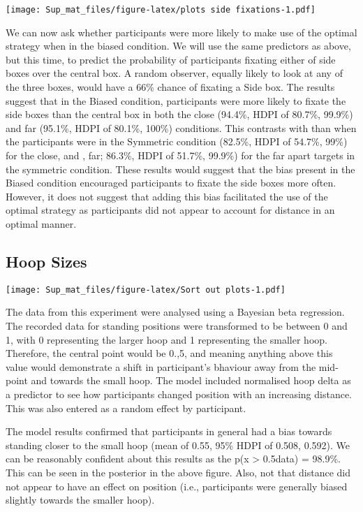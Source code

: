 \documentclass[
]{article}
\begin{document}
\texttt{[image: Sup\_mat\_files/figure-latex/plots side fixations-1.pdf]}

We can now ask whether participants were more likely to make use of the optimal strategy when in the biased condition. We will use the same predictors as above, but this time, to predict the probability of participants fixating either of side boxes over the central box. A random observer, equally likely to look at any of the three boxes, would have a 66\% chance of fixating a Side box. The results suggest that in the Biased condition, participants were more likely to fixate the side boxes than the central box in both the close (94.4\%, HDPI of \textbar{}80.7\%, 99.9\%\textbar{}) and far (95.1\%, HDPI of \textbar{}80.1\%, 100\%\textbar{}) conditions. This contrasts with than when the participants were in the Symmetric condition (82.5\%, HDPI of \textbar{}54.7\%, 99\%\textbar{}) for the close, and , far; 86.3\%, HDPI of \textbar{}51.7\%, 99.9\%\textbar{}) for the far apart targets in the symmetric condition. These results would suggest that the bias present in the Biased condition encouraged participants to fixate the side boxes more often. However, it does not suggest that adding this bias facilitated the use of the optimal strategy as participants did not appear to account for distance in an optimal manner.

\hypertarget{hoop-sizes-1}{%
\subsection{Hoop Sizes}\label{hoop-sizes-1}}

\texttt{[image: Sup\_mat\_files/figure-latex/Sort out plots-1.pdf]}

The data from this experiment were analysed using a Bayesian beta regression. The recorded data for standing positions were transformed to be between 0 and 1, with 0 representing the larger hoop and 1 representing the smaller hoop. Therefore, the central point would be 0.,5, and meaning anything above this value would demonstrate a shift in participant's bhaviour away from the mid-point and towards the small hoop. The model included normalised hoop delta as a predictor to see how participants changed position with an increasing distance. This was also entered as a random effect by participant.

The model results confirmed that participants in general had a bias towards standing closer to the small hoop (mean of 0.55, 95\% HDPI of \textbar{}0.508, 0.592\textbar{}). We can be reasonably confident about this results as the p(x \textgreater{} 0.5\textbar{}data) = 98.9\%. This can be seen in the posterior in the above figure. Also, not that distance did not appear to have an effect on position (i.e., participants were generally biased slightly towards the smaller hoop).
\end{document}
